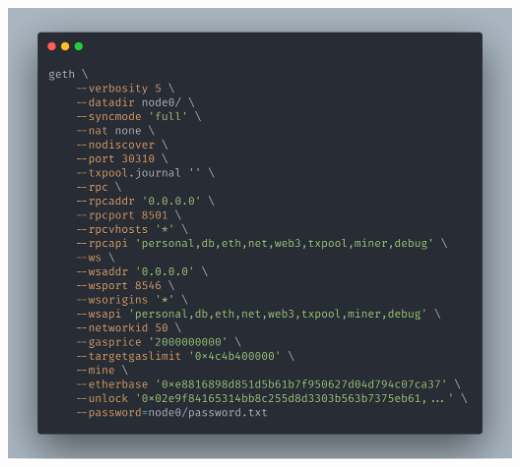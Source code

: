 \newlength{\imageheight}
\includegraphics[trim=0 0.49\imageheight{} 0 0, clip, width=.9\columnwidth]{./Abbildungen/Kapitel_03/geth.png}

\clearpage


